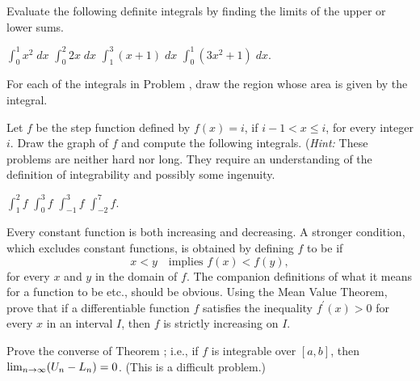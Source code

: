 \begin{exercises}

Evaluate the following definite integrals by finding the limits
of the upper or lower sums.
\begin{exenum}
\x
$\int_0^1 x^2 \; dx$
\x
$\int_0^2 2x \; dx$
\x
$\int_1^3 (x+1) \; dx$
\x
$\int_0^1 (3x^2 + 1) \; dx$.
\end{exenum}

For each of the integrals in Problem ,
draw the region whose area is given by the integral.

Let $f$ be the step function defined by
$f(x) = i$, if $i-1 < x \leq i$,
for every integer $i$.
Draw the graph of $f$ and compute the following integrals.
(\emph{Hint:} These problems are neither hard nor long.
They require an understanding of the definition of
integrability and possibly some ingenuity.
\begin{exenum}
\x
$\int_1^2 f$
\x
$\int_0^3 f$
\x
$\int_{-1}^3 f$
\x
$\int_{-2}^7 f$.
\end{exenum}

Every constant function is both increasing and decreasing.
A stronger condition, which excludes constant functions,
is obtained by defining $f$ to be  if
\[
x<y \quad \mbox{implies  $f(x) < f(y)$}
,
\]
for every $x$ and $y$ in the domain of $f$.
The companion definitions of what it means for a function to be
 etc.,
should be obvious.
Using the Mean Value Theorem, prove that if a
differentiable function $f$ satisfies the inequality
$f^\prime(x)>0$ for every $x$ in an interval $I$,
then $f$ is strictly increasing on $I$.

Prove the converse of Theorem ;
i.e., if $f$ is integrable over $[a,b]$, then
$\lim_{n\rightarrow\infty} (U_n - L_n) = 0$.
(This is a difficult problem.)

\end{exercises}
